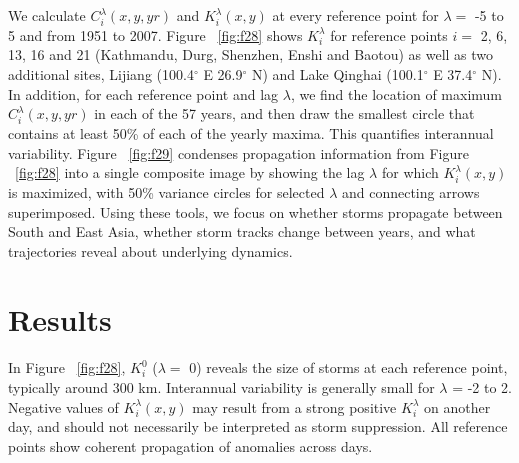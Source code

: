 	We calculate $C_i^\lambda(x,y,yr)$ and $K_i^\lambda(x,y)$ at every reference point for $\lambda =$ -5 to 5 and from 1951 to 2007. Figure ~\ref{fig:f28} shows $K_i^\lambda$ for reference points $i=$ 2, 6, 13, 16 and 21 (Kathmandu, Durg, Shenzhen, Enshi and Baotou) as well as two additional sites, Lijiang (100.4$^{\circ}$ E 26.9$^{\circ}$ N) and Lake Qinghai (100.1$^{\circ}$ E 37.4$^{\circ}$ N). In addition, for each reference point and lag $\lambda$, we find the location of maximum $C_i^\lambda(x,y,yr)$ in each of the 57 years, and then draw the smallest circle that contains at least 50\% of each of the yearly maxima. This quantifies interannual variability. Figure ~\ref{fig:f29} condenses propagation information from Figure ~\ref{fig:f28} into a single composite image by showing the lag $\lambda$ for which $K_i^\lambda(x,y)$ is maximized, with 50\% variance circles for selected $\lambda$ and connecting arrows superimposed. Using these tools, we focus on whether storms propagate between South and East Asia, whether storm tracks change between years, and what trajectories reveal about underlying dynamics.
	
\section{Results}	
		 	 		
	 In Figure ~\ref{fig:f28}, $K_i^0$ ($\lambda =$ 0) reveals the size of storms at each reference point, typically around 300 km. Interannual variability is generally small for $\lambda$ = -2 to 2. Negative values of $K_i^\lambda(x,y)$ may result from a strong positive $K_i^{\lambda}$  on another day, and should not necessarily be interpreted as storm suppression. All reference points show coherent propagation of anomalies across days. 
	 
